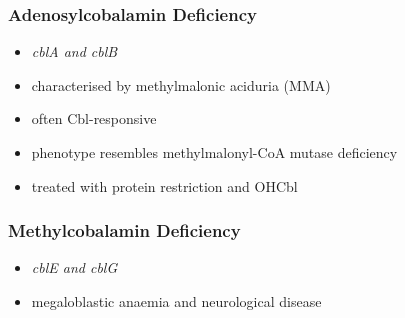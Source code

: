\documentclass{scrartcl}
\begin{document}
\subsubsection{Adenosylcobalamin Deficiency}
\label{sec:orga235c90}
\begin{itemize}
\item \emph{cblA and cblB}
\item characterised by methylmalonic aciduria (MMA)
\item often Cbl-responsive
\item phenotype resembles methylmalonyl-CoA mutase deficiency
\item treated with protein restriction and OHCbl
\end{itemize}

\subsubsection{Methylcobalamin Deficiency}
\label{sec:orge6bac3b}
\begin{itemize}
\item \emph{cblE and cblG}
\item megaloblastic anaemia and neurological disease
\end{itemize}
\end{document}
